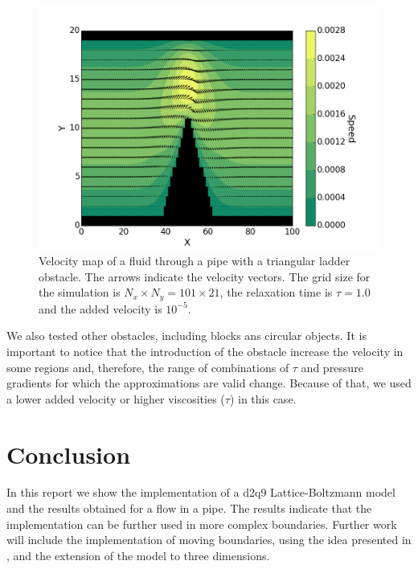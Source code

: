 \documentclass[aps,prl,reprint,groupedaddress]{revtex4-1}
\begin{document}
\begin{figure}[ht]
	\includegraphics[scale=0.4]{arrows.png}
	\caption{Velocity map of a fluid through a pipe with a triangular ladder obstacle. The arrows indicate the velocity vectors. The grid size for the simulation is $N_x \times N_y = 101 \times 21$, the relaxation time is $\tau=1.0$ and the added velocity is $10^{-5}$. \label{arrows}}
\end{figure}

We also tested other obstacles, including blocks ans circular objects. It is important to notice that the introduction of the obstacle increase the velocity in some regions and, therefore, the range of combinations of $\tau$ and pressure gradients for which the approximations are valid change. Because of that, we used a lower added velocity or higher viscosities ($\tau$) in this case.

\section{Conclusion \label{conclusion}}

In this report we show the implementation of a d2q9 Lattice-Boltzmann model and the results obtained for a flow in a pipe. The results indicate that the implementation can be further used in more complex boundaries. Further work will include the implementation of moving boundaries, using the idea presented in \cite{Kang2008}, and the extension of the model to three dimensions.

\end{document}
